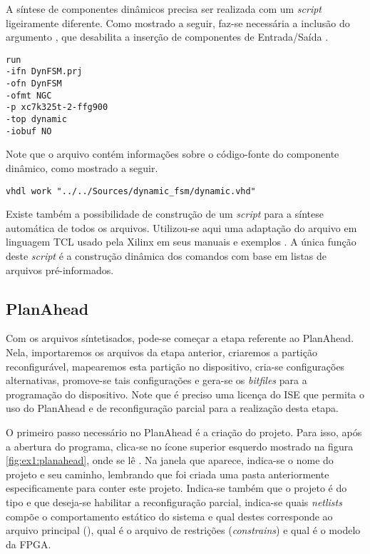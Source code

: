 \documentclass[11pt,a4paper,oneside]{book}
\begin{document}
A síntese de componentes dinâmicos precisa ser realizada com um \textit{script}  ligeiramente diferente.
Como mostrado a seguir, faz-se necessária a inclusão do argumento , que desabilita a inserção de componentes de Entrada/Saída \cite{ug743, ug748}.
\begin{lstlisting}[style=customVHDL]
run
-ifn DynFSM.prj
-ofn DynFSM
-ofmt NGC
-p xc7k325t-2-ffg900
-top dynamic
-iobuf NO
\end{lstlisting}
Note que o arquivo  contém informações sobre o código-fonte do componente dinâmico, como mostrado a seguir.
\begin{lstlisting}[style=customVHDL]
vhdl work "../../Sources/dynamic_fsm/dynamic.vhd"
\end{lstlisting}

Existe também a possibilidade de construção de um \textit{script} para a síntese automática de todos os arquivos.
Utilizou-se aqui uma adaptação do arquivo em linguagem TCL usado pela Xilinx em seus manuais e exemplos \cite{ug702, ug743, ug744}.
A única função deste \textit{script} é a construção dinâmica dos comandos com base em listas de arquivos pré-informados.

\subsection{PlanAhead}
Com os arquivos síntetisados, pode-se começar a etapa referente ao PlanAhead.
Nela, importaremos os arquivos da etapa anterior, criaremos a partição reconfigurável, mapearemos esta partição no dispositivo, cria-se configurações alternativas, promove-se tais configurações e gera-se os \textit{bitfiles} para a programação do dispositivo.
Note que é preciso uma licença do ISE que permita o uso do PlanAhead e de reconfiguração parcial para a realização desta etapa.

O primeiro passo necessário no PlanAhead é a criação do projeto.
Para isso, após a abertura do programa, clica-se no ícone superior esquerdo mostrado na figura \ref{fig:ex1:planahead}, onde se lê .
Na janela que aparece, indica-se o nome do projeto e seu caminho, lembrando que foi criada uma pasta anteriormente especificamente para conter este projeto.
Indica-se também que o projeto é do tipo  e que deseja-se habilitar a reconfiguração parcial, indica-se quais \textit{netlists} compõe o comportamento estático do sistema e qual destes corresponde ao arquivo principal (), qual é o arquivo de restrições (\textit{constrains}) e qual é o modelo da FPGA.
\end{document}
